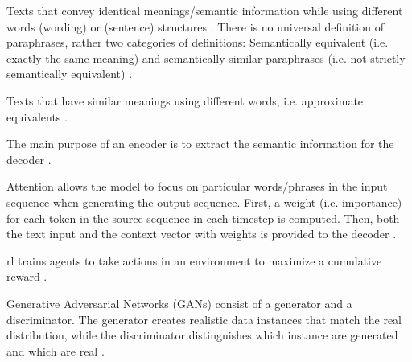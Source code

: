 \begin{definition}
    [Paraphrases]
    Texts that convey identical meanings/semantic information while using different words (wording) or (sentence) structures 
    \cite{fu_learning_2024,zhou_paraphrase_2021,palivela_optimization_2021,kurt_pehlivanoglu_comparative_2024,gohsen_captions_2023,gohsen_task_oriented_2024}.
    There is no universal definition of paraphrases, rather two categories of definitions: 
    Semantically equivalent (i.e. exactly the same meaning) and 
    semantically similar paraphrases (i.e. not strictly semantically equivalent) \cite{gohsen_task_oriented_2024}.
\end{definition}

\begin{definition}
    Texts that have similar meanings using different words, i.e. approximate equivalents \cite{zhou_paraphrase_2025}.
\end{definition}

\begin{definition}
    [Encoder]
    The main purpose of an encoder is to extract the semantic information for the decoder \cite{zhou_paraphrase_2021}.
\end{definition}

\begin{definition}
    Attention allows the model to focus on particular words/phrases in the input sequence when generating the output sequence.
    First, a weight (i.e. importance) for each token in the source sequence in each timestep is computed.
    Then, both the text input and the context vector with weights is provided to the decoder \cite{zhou_paraphrase_2021}.
\end{definition}

\begin{definition}
    [\acl{rl}]
    \ac{rl} trains agents to take actions in an environment to maximize a cumulative reward \cite{zhou_paraphrase_2021}.
\end{definition}

\begin{definition}
    [GANs]
    Generative Adversarial Networks (GANs) consist of a generator and a discriminator.
    The generator creates realistic data instances that match the real distribution, 
    while the discriminator distinguishes which instance are generated and which are real \cite{zhou_paraphrase_2021}.
\end{definition}

